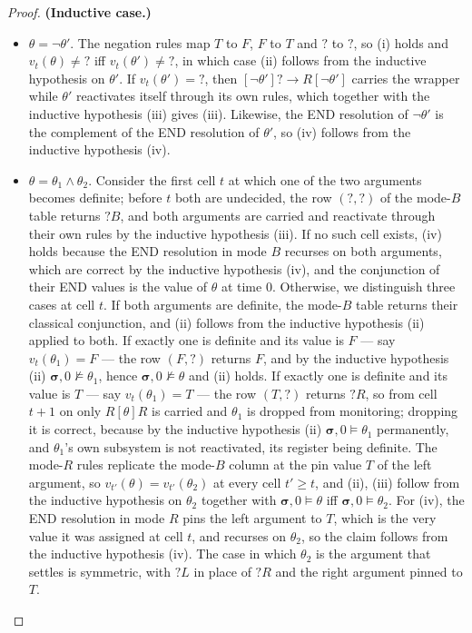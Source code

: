 \begin{proof}
\noindent
\textbf{(Inductive case.)}

\begin{itemize}
    \item $\theta=\lnot\theta'$. The negation rules map $T$ to $F$, $F$ to $T$ and $?$ to $?$, so (i) holds and $v_t(\theta)\neq{?}$ iff $v_t(\theta')\neq{?}$, in which case (ii) follows from the inductive hypothesis on $\theta'$. If $v_t(\theta')={?}$, then $[\lnot\theta']?\rightarrow R[\lnot\theta']$ carries the wrapper while $\theta'$ reactivates itself through its own rules, which together with the inductive hypothesis (iii) gives (iii). Likewise, the END resolution of $\lnot\theta'$ is the complement of the END resolution of $\theta'$, so (iv) follows from the inductive hypothesis (iv).
    \item $\theta=\theta_1\land\theta_2$. Consider the first cell $t$ at which one of the two arguments becomes definite; before $t$ both are undecided, the row $(?,?)$ of the mode-$B$ table returns $?B$, and both arguments are carried and reactivate through their own rules by the inductive hypothesis (iii). If no such cell exists, (iv) holds because the END resolution in mode $B$ recurses on both arguments, which are correct by the inductive hypothesis (iv), and the conjunction of their END values is the value of $\theta$ at time $0$. Otherwise, we distinguish three cases at cell $t$.
    If both arguments are definite, the mode-$B$ table returns their classical conjunction, and (ii) follows from the inductive hypothesis (ii) applied to both.
    If exactly one is definite and its value is $F$ --- say $v_t(\theta_1)=F$ --- the row $(F,?)$ returns $F$, and by the inductive hypothesis (ii) $\boldsymbol{\sigma},0\not\models\theta_1$, hence $\boldsymbol{\sigma},0\not\models\theta$ and (ii) holds.
    If exactly one is definite and its value is $T$ --- say $v_t(\theta_1)=T$ --- the row $(T,?)$ returns $?R$, so from cell $t+1$ on only $R[\theta]R$ is carried and $\theta_1$ is dropped from monitoring; dropping it is correct, because by the inductive hypothesis (ii) $\boldsymbol{\sigma},0\models\theta_1$ permanently, and $\theta_1$'s own subsystem is not reactivated, its register being definite. The mode-$R$ rules replicate the mode-$B$ column at the pin value $T$ of the left argument, so $v_{t'}(\theta)=v_{t'}(\theta_2)$ at every cell $t'\geq t$, and (ii), (iii) follow from the inductive hypothesis on $\theta_2$ together with $\boldsymbol{\sigma},0\models\theta$ iff $\boldsymbol{\sigma},0\models\theta_2$. For (iv), the END resolution in mode $R$ pins the left argument to $T$, which is the very value it was assigned at cell $t$, and recurses on $\theta_2$, so the claim follows from the inductive hypothesis (iv). The case in which $\theta_2$ is the argument that settles is symmetric, with $?L$ in place of $?R$ and the right argument pinned to $T$.
\end{itemize}


\end{proof}
